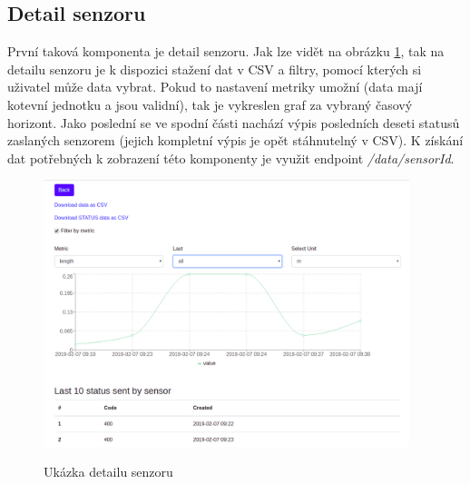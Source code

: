 \documentclass[thesis=M,czech]{FITthesis}[2018/10/20]
\begin{document}
\subsection{Detail senzoru}
První taková komponenta je detail senzoru. Jak lze vidět na obrázku \ref{fig:sensor_graph}, tak na detailu senzoru je k dispozici stažení dat v CSV a filtry, pomocí kterých si uživatel může data vybrat. Pokud to nastavení metriky umožní (data mají kotevní jednotku a jsou validní), tak je vykreslen graf za vybraný časový horizont. Jako poslední se ve spodní části nachází výpis posledních deseti statusů zaslaných senzorem (jejich kompletní výpis je opět stáhnutelný v CSV). K získání dat potřebných k zobrazení této komponenty je využit endpoint \textit{/data/sensorId}.
\begin{figure}[h]
\caption{Ukázka detailu senzoru}
\centering
\includegraphics[width=0.95\textwidth]{sensor_detail}
\label{fig:sensor_graph}
\end{figure}

\newpage
\end{document}
